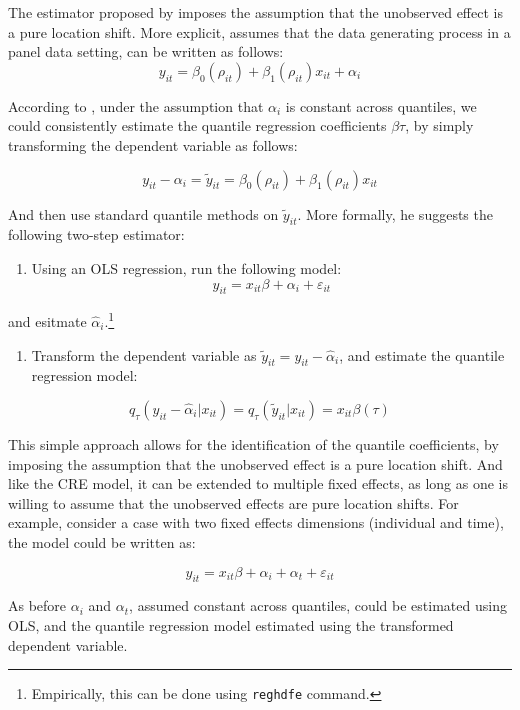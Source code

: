 \documentclass[bib]{statapress}
\providecommand{\tightlist}{%
  \setlength{\itemsep}{0pt}\setlength{\parskip}{0pt}}\usepackage{longtable,booktabs,array}
\begin{document}
The estimator proposed by \citet{canay2011} imposes the assumption that
the unobserved effect is a pure location shift. More explicit, assumes
that the data generating process in a panel data setting, can be written
as follows:
\[y_{it} =\beta_0(\rho_{it}) +  \beta_1(\rho_{it}) x_{it} + \alpha_i
\]

According to \citet{canay2011}, under the assumption that \(\alpha_i\)
is constant across quantiles, we could consistently estimate the
quantile regression coefficients \(\beta{\tau}\), by simply transforming
the dependent variable as follows:

\[y_{it}-\alpha_i =\tilde y_{it}=\beta_0(\rho_{it}) +  \beta_1(\rho_{it}) x_{it} 
\]

And then use standard quantile methods on \(\tilde{y}_{it}\). More
formally, he suggests the following two-step estimator:

\begin{enumerate}
\def\labelenumi{\arabic{enumi}.}
\tightlist
\item
  Using an OLS regression, run the following model:
  \[y_{it} = x_{it}\beta + \alpha_i + \varepsilon_{it}\]
\end{enumerate}

and esitmate \(\hat{\alpha}_i\).\footnote{Empirically, this can be done
  using \texttt{reghdfe} command.}

\begin{enumerate}
\def\labelenumi{\arabic{enumi}.}
\setcounter{enumi}{1}
\tightlist
\item
  Transform the dependent variable as
  \(\tilde y_{it}=y_{it}-\hat{\alpha}_i\), and estimate the quantile
  regression model:
\end{enumerate}

\[q_{\tau}(y_{it}-\hat \alpha_i|x_{it})=q_{\tau}(\tilde y_{it}|x_{it}) = x_{it}\beta(\tau)\]

This simple approach allows for the identification of the quantile
coefficients, by imposing the assumption that the unobserved effect is a
pure location shift. And like the CRE model, it can be extended to
multiple fixed effects, as long as one is willing to assume that the
unobserved effects are pure location shifts. For example, consider a
case with two fixed effects dimensions (individual and time), the model
could be written as:

\[y_{it} = x_{it}\beta + \alpha_i + \alpha_t + \varepsilon_{it}\]

As before \(\alpha_i\) and \(\alpha_t\), assumed constant across
quantiles, could be estimated using OLS, and the quantile regression
model estimated using the transformed dependent variable.
\end{document}
